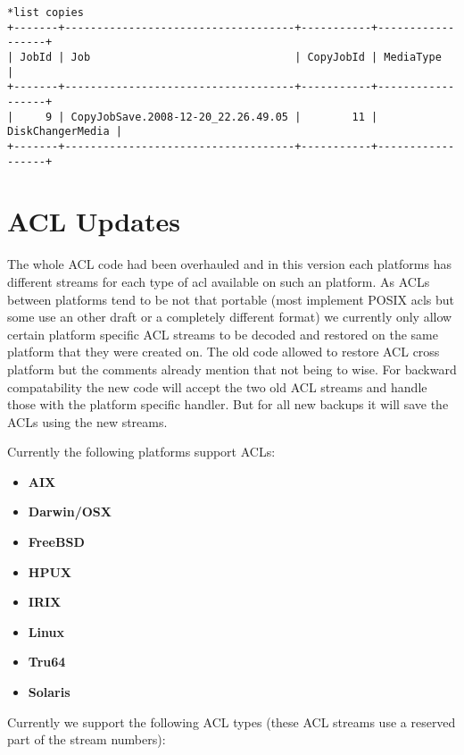 \begin{verbatim}
*list copies
+-------+------------------------------------+-----------+------------------+
| JobId | Job                                | CopyJobId | MediaType        |
+-------+------------------------------------+-----------+------------------+
|     9 | CopyJobSave.2008-12-20_22.26.49.05 |        11 | DiskChangerMedia |
+-------+------------------------------------+-----------+------------------+
\end{verbatim}

\section{ACL Updates}
The whole ACL code had been overhauled and in this version each platforms has
different streams for each type of acl available on such an platform. As ACLs
between platforms tend to be not that portable (most implement POSIX acls but
some use an other draft or a completely different format) we currently only
allow certain platform specific ACL streams to be decoded and restored on the
same platform that they were created on.  The old code allowed to restore ACL
cross platform but the comments already mention that not being to wise. For
backward compatability the new code will accept the two old ACL streams and
handle those with the platform specific handler. But for all new backups it
will save the ACLs using the new streams.

Currently the following platforms support ACLs:

\begin{itemize}
 \item {\bf AIX}
 \item {\bf Darwin/OSX}
 \item {\bf FreeBSD}
 \item {\bf HPUX}
 \item {\bf IRIX}
 \item {\bf Linux}
 \item {\bf Tru64}
 \item {\bf Solaris}
\end{itemize}

Currently we support the following ACL types (these ACL streams use a reserved
part of the stream numbers):


